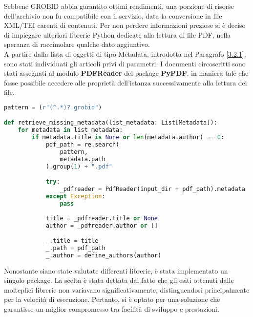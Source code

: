 Sebbene GROBID abbia garantito ottimi rendimenti, una porzione di risorse dell'archivio non fu compatibile con il servizio, data la conversione in file XML/TEI carenti di contenuti. Per non perdere informazioni preziose si è deciso di impiegare ulteriori librerie Python dedicate alla lettura di file PDF, nella speranza di raccimolare qualche dato aggiuntivo. \vspace{7pt} \\
A partire dalla lista di oggetti di tipo Metadata, introdotta nel Paragrafo \ref{3.2.1}, sono stati individuati gli articoli privi di parametri. I documenti circoscritti sono stati assegnati al modulo \textbf{PDFReader} del package \textbf{PyPDF}, in maniera tale che fosse possibile accedere alle proprietà dell'istanza successivamente alla lettura dei file.
\begin{lstlisting}[language=python, caption=Lettura dei documenti PDF tramite la libreria PyPDF]
pattern = (r"(^.*)?.grobid")

def retrieve_missing_metadata(list_metadata: List[Metadata]):
    for metadata in list_metadata:
        if metadata.title is None or len(metadata.author) == 0:
            pdf_path = re.search(
                pattern,
                metadata.path
            ).group(1) + ".pdf"

            try:
                _pdfreader = PdfReader(input_dir + pdf_path).metadata
            except Exception:
                pass
             
            title = _pdfreader.title or None
            author = _pdfreader.author or []

            _.title = title
            _.path = pdf_path
            _.author = define_authors(author)\end{lstlisting}
Nonostante siano state valutate differenti librerie, è stata implementato un singolo package. La scelta è stata dettata dal fatto che gli esiti ottenuti dalle molteplici librerie non variavano significativamente, distinguendosi principalmente per la velocità di esecuzione. Pertanto, si è optato per una soluzione che garantisse un miglior compromesso tra facilità di sviluppo e prestazioni.
